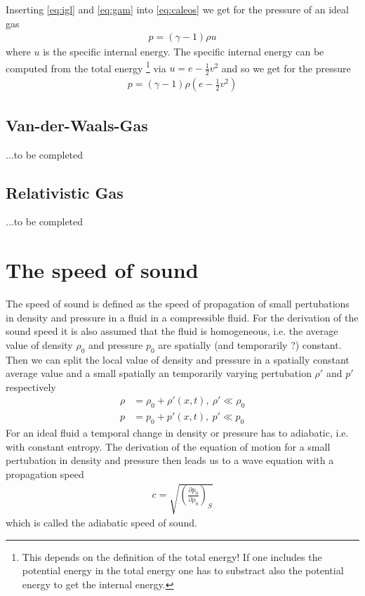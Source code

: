 \documentclass[a4paper,
					fontsize=12pt,
					twoside,
					pagesize,
					cleardoublepage=plain,
					headsepline,
					bibliography=totoc
					]{scrbook}
\newcommand{\lra}[1]{{ \left( #1 \right) }}
\begin{document}
Inserting \eqref{eq:igl} and \eqref{eq:gam} into \eqref{eq:caleos} we get for
the pressure of an ideal gas
\begin{align}
p=(\gamma-1) \rho u \label{eq:igpress}
\end{align}
where $u$ is the specific internal energy. The specific internal energy can be
computed from the total energy \footnote{This depends
 on the definition of the total energy! If one includes the potential energy
in the total energy one has to substract also the potential energy to get the
internal energy.} via $u=e-\frac{1}{2}v^2$ and so we get for the
pressure
\begin{align}
p=\lra{\gamma-1} \rho \lra{e-\frac{1}{2}v^2}
\end{align}

\section{Van-der-Waals-Gas}

...to be completed

\section{Relativistic Gas}

...to be completed


\chapter{The speed of sound}
The speed of sound is defined as the speed of propagation of small pertubations
in density and pressure in a fluid in a compressible fluid. For the derivation
of the sound speed it is also assumed that the fluid is homogeneous, i.e. the
average value of density $\rho_0$ and pressure $p_0$ are spatially (and
temporarily ?) constant. Then we can split the local value of density and
pressure in a spatially constant average value and a small spatially an
temporarily varying pertubation $\rho'$ and $p'$ respectively
\begin{align}
\rho &= \rho_0 + \rho'(x,t),\ \rho' \ll \rho_0 \\
p &= p_0 + p'(x,t),\ p' \ll p_0
\end{align}
For an ideal fluid a temporal change in density or pressure has to adiabatic,
i.e. with constant entropy. The derivation of the equation of motion for a small
pertubation in density and pressure then leads us to a wave equation with a
propagation speed
\begin{align}
c=\sqrt{\lra{\frac{\partial p_0}{\partial \rho_0}}_S}
\end{align}
which is called the adiabatic speed of sound. 
\end{document}
